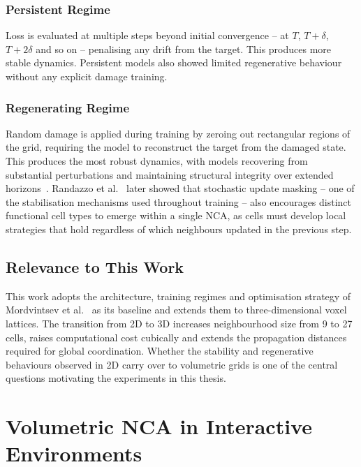 \subsubsection{Persistent Regime}

Loss is evaluated at multiple steps beyond initial convergence -- at $T$,
$T + \delta$, $T + 2\delta$ and so on -- penalising any drift from the target.
This produces more stable dynamics. Persistent models also showed limited regenerative 
behaviour without any explicit damage training.

\subsubsection{Regenerating Regime}

Random damage is applied during training by zeroing out rectangular regions of the
grid, requiring the model to reconstruct the target from the damaged state. This
produces the most robust dynamics, with models recovering from substantial
perturbations and maintaining structural integrity over extended
horizons~\cite{Mordvintsev2020}. Randazzo et al.~\cite{Randazzo2020} later showed
that stochastic update masking -- one of the stabilisation mechanisms used throughout
training -- also encourages distinct functional cell types to emerge within a single
NCA, as cells must develop local strategies that hold regardless of which neighbours
updated in the previous step.

\subsection{Relevance to This Work}

This work adopts the architecture, training regimes and optimisation strategy of
Mordvintsev et al.~\cite{Mordvintsev2020} as its baseline and extends them to
three-dimensional voxel lattices. The transition from 2D to 3D increases neighbourhood
size from 9 to 27 cells, raises computational cost cubically and extends the
propagation distances required for global coordination. Whether the stability and
regenerative behaviours observed in 2D carry over to volumetric grids is one of the
central questions motivating the experiments in this thesis.

\clearpage

\section{Volumetric NCA in Interactive Environments}

